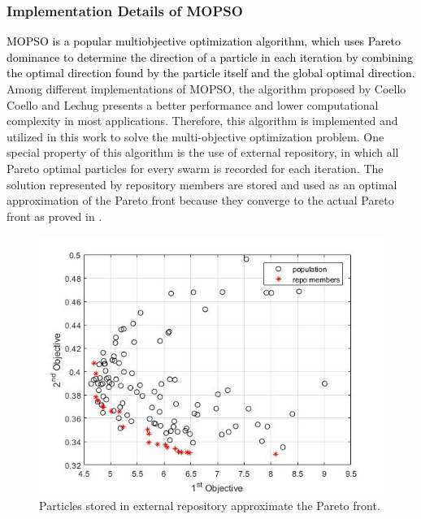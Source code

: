 \subsubsection{Implementation Details of MOPSO} %

\textcolor{black}{MOPSO is a popular multiobjective optimization algorithm, which uses Pareto dominance to determine the direction of a particle in each iteration by combining the optimal direction found by the particle itself and the global optimal direction.} Among different implementations of MOPSO, the algorithm proposed by Coello Coello and Lechug presents a better performance and lower computational complexity in most applications\cite{coello2002mopso}. Therefore, this algorithm is implemented and utilized in this work to solve the multi-objective optimization problem. One special property of this algorithm is the use of external repository, in which all Pareto optimal particles for every swarm is recorded for each iteration. The solution represented by repository members are stored and used as an optimal approximation of the Pareto front because they converge to the actual Pareto front as proved in \cite{coello2002mopso}. %

\begin{figure}[t]
	\centering
	\includegraphics[scale=.6]{Fig/repo_members.jpg}
	\caption{Particles stored in external repository approximate the Pareto front.}%
		\label{fig:repo_members}
	\end{figure}

